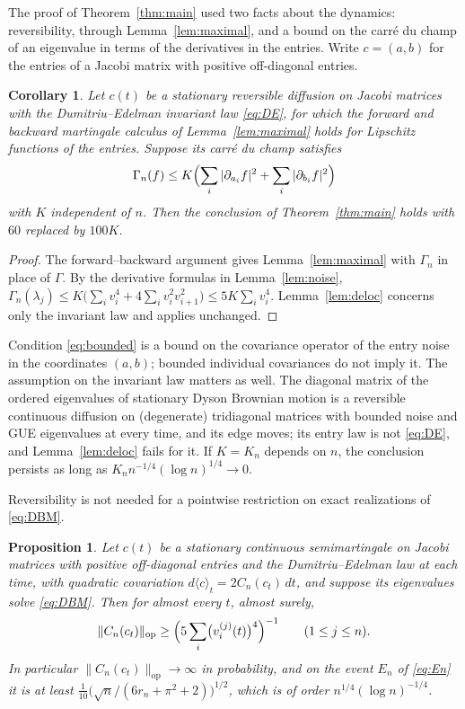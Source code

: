 \documentclass[11pt]{amsart}
\newtheorem{proposition}[theorem]{Proposition}
\newtheorem{corollary}[theorem]{Corollary}
\theoremstyle{remark}
\begin{document}
The proof of Theorem~\ref{thm:main} used two facts about the dynamics: reversibility, through Lemma~\ref{lem:maximal},
and a bound on the carr\'e du champ of an eigenvalue in terms of the derivatives in the entries. Write $c=(a,b)$ for the
entries of a Jacobi matrix with positive off-diagonal entries.

\begin{corollary}\label{cor:bounded}
Let $c(t)$ be a stationary reversible diffusion on Jacobi matrices with the Dumitriu--Edelman invariant law
\eqref{eq:DE}, for which the forward and backward martingale calculus of Lemma~\ref{lem:maximal} holds for Lipschitz
functions of the entries. Suppose its carr\'e du champ satisfies
\begin{equation}\label{eq:bounded}
\Gamma_n(f)\le K\Bigl(\sum_i|\partial_{a_i}f|^2+\sum_i|\partial_{b_i}f|^2\Bigr)
\end{equation}
with $K$ independent of $n$. Then the conclusion of Theorem~\ref{thm:main} holds with $60$ replaced by $100K$.
\end{corollary}

\begin{proof}
The forward--backward argument gives Lemma~\ref{lem:maximal} with $\Gamma_n$ in place of $\Gamma$. By the derivative
formulas in Lemma~\ref{lem:noise},
$\Gamma_n(\lambda_j)\le K\bigl(\sum_iv_i^4+4\sum_iv_i^2v_{i+1}^2\bigr)\le5K\sum_iv_i^4$. Lemma~\ref{lem:deloc}
concerns only the invariant law and applies unchanged.
\end{proof}

Condition \eqref{eq:bounded} is a bound on the covariance operator of the entry noise in the coordinates $(a,b)$; bounded
individual covariances do not imply it. The assumption on the invariant law matters as well. The diagonal matrix of the
ordered eigenvalues of stationary Dyson Brownian motion is a reversible continuous diffusion on (degenerate) tridiagonal
matrices with bounded noise and GUE eigenvalues at every time, and its edge moves; its entry law is not \eqref{eq:DE}, and
Lemma~\ref{lem:deloc} fails for it. If $K=K_n$ depends on $n$, the conclusion persists as long as
$K_nn^{-1/4}(\log n)^{1/4}\to0$.

Reversibility is not needed for a pointwise restriction on exact realizations of \eqref{eq:DBM}.

\begin{proposition}\label{prop:growth}
Let $c(t)$ be a stationary continuous semimartingale on Jacobi matrices with positive off-diagonal entries and the
Dumitriu--Edelman law at each time, with quadratic covariation $d\langle c\rangle_t=2C_n(c_t)\,dt$, and suppose its
eigenvalues solve \eqref{eq:DBM}. Then for almost every $t$, almost surely,
\[
\|C_n(c_t)\|_{\mathrm{op}}\ge\Bigl(5\sum_i\bigl(v_i^{(j)}(t)\bigr)^4\Bigr)^{-1}\qquad(1\le j\le n).
\]
In particular $\|C_n(c_t)\|_{\mathrm{op}}\to\infty$ in probability, and on the event $E_n$ of \eqref{eq:En} it is at least
$\frac1{10}\bigl(\sqrt n/(6r_n+\pi^2+2)\bigr)^{1/2}$, which is of order $n^{1/4}(\log n)^{-1/4}$.
\end{proposition}
\end{document}

